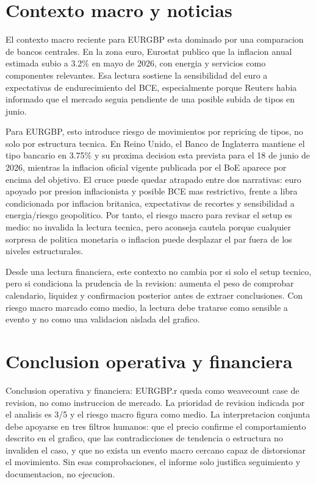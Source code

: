 \documentclass[11pt,a4paper]{article}
\begin{document}
\section*{Contexto macro y noticias}
El contexto macro reciente para EURGBP esta dominado por una comparacion de bancos centrales. En la zona euro, Eurostat publico que la inflacion anual estimada subio a 3.2\% en mayo de 2026, con energia y servicios como componentes relevantes. Esa lectura sostiene la sensibilidad del euro a expectativas de endurecimiento del BCE, especialmente porque Reuters habia informado que el mercado seguia pendiente de una posible subida de tipos en junio.

Para EURGBP, esto introduce riesgo de movimientos por repricing de tipos, no solo por estructura tecnica. En Reino Unido, el Banco de Inglaterra mantiene el tipo bancario en 3.75\% y su proxima decision esta prevista para el 18 de junio de 2026, mientras la inflacion oficial vigente publicada por el BoE aparece por encima del objetivo. El cruce puede quedar atrapado entre dos narrativas: euro apoyado por presion inflacionista y posible BCE mas restrictivo, frente a libra condicionada por inflacion britanica, expectativas de recortes y sensibilidad a energia/riesgo geopolitico. Por tanto, el riesgo macro para revisar el setup es medio: no invalida la lectura tecnica, pero aconseja cautela porque cualquier sorpresa de politica monetaria o inflacion puede desplazar el par fuera de los niveles estructurales.

Desde una lectura financiera, este contexto no cambia por si solo el setup tecnico, pero si condiciona la prudencia de la revision: aumenta el peso de comprobar calendario, liquidez y confirmacion posterior antes de extraer conclusiones. Con riesgo macro marcado como medio, la lectura debe tratarse como sensible a evento y no como una validacion aislada del grafico.

\section*{Conclusion operativa y financiera}
Conclusion operativa y financiera: EURGBP.r queda como weavecount case de revision, no como instruccion de mercado. La prioridad de revision indicada por el analisis es 3/5 y el riesgo macro figura como medio. La interpretacion conjunta debe apoyarse en tres filtros humanos: que el precio confirme el comportamiento descrito en el grafico, que las contradicciones de tendencia o estructura no invaliden el caso, y que no exista un evento macro cercano capaz de distorsionar el movimiento. Sin esas comprobaciones, el informe solo justifica seguimiento y documentacion, no ejecucion.
\end{document}
